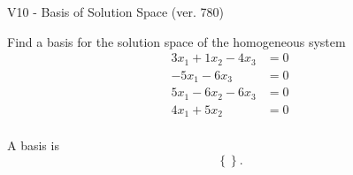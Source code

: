 \begin{exercise}
  \begin{exerciseTitle}V10 - Basis of Solution Space (ver. 780)\end{exerciseTitle}
  \begin{exerciseStatement}
    Find a basis for the solution space of the homogeneous system 
\begin{align*}
 3 x_ 1 + 1 x_ 2 -4 x_ 3 &= 0  \\ 
  -5 x_ 1 -6 x_ 3 &= 0  \\ 
  5 x_ 1 -6 x_ 2 -6 x_ 3 &= 0  \\ 
  4 x_ 1 + 5 x_ 2 &= 0  \\ 
 \end{align*}


 
  \end{exerciseStatement}

  \begin{exerciseAnswer}
   A basis is   
\[\left\{\right\}.\]

  


  \end{exerciseAnswer}
\end{exercise}
